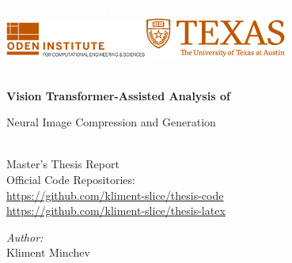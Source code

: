 \begin{titlepage}


\TITLEBOX

\begin{center}



\sffamily\textsc{\huge{\textcolor{white}{The University of Texas at Austin}}}\\[4cm]


\includegraphics[width=0.35\textwidth]{media/faculty.png}\makebox[1.5cm]{}\includegraphics[width=0.35\textwidth]{media/unilogo.png}~\\[1.5cm]



\HRule \\[0.4cm]
{
 \huge \bfseries \sffamily Vision Transformer-Assisted Analysis of
 
Neural Image Compression and Generation  \\[0.4cm] 
}

\HRule \\[0.4cm] 

\normalfont \LARGE \sffamily Master's Thesis Report \\[1.5cm]
\normalfont \large \sffamily Official Code Repositories: \\
\normalfont \large \sffamily \url{https://github.com/kliment-slice/thesis-code} \\[0.05cm]
\normalfont \large \sffamily \url{https://github.com/kliment-slice/thesis-latex} \\[1.0cm]

\noindent
\begin{minipage}{0.4\textwidth}
\begin{center} \large
\emph{Author:}\\
Kliment Minchev\\
\end{center}
\end{minipage}


\end{center}
\end{titlepage}
